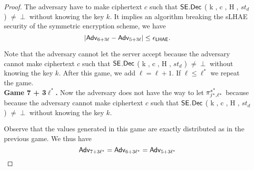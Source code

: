 \begin{proof}
 The adversary have to make ciphertext $c$ such that $\mathsf{SE}$.$\mathsf{Dec}$ ( k , c , H , $st_d$ ) $\neq \perp$ without knowing the key $k$. It implies an algorithm breaking the sLHAE security of the symmetric encryption scheme, we have
 \begin{equation}
  |\mathsf{Adv}_{6 + 3\ell} - \mathsf{Adv}_{5 + 3\ell} | \leq \epsilon_{\mathsf{LHAE}}.
 \end{equation}%

 Note that the adversary cannot let the server accept because the adversary cannot make ciphertext $c$ such that $\mathsf{SE}$.$\mathsf{Dec}$ ( k , c , H , $st_d$ ) $\neq \perp$ without knowing the key $k$.
 After this game, we add $\ell = \ell + 1$. If $\ell \leq \ell^{\ast}$ we repeat the game.
\vspace{10pt}\\%
%
%
 \textbf{Game 7 + 3$\ell^{\ast}$.} Now the adversary does not have the way to let $\pi^{s^{\ast}}_{j^{\ast},\ell^{\ast}}$ because because the adversary cannot make ciphertext $c$ such that $\mathsf{SE}$.$\mathsf{Dec}$ ( k , c , H , $st_d$ ) $\neq \perp$ without knowing the key $k$.

 Observe that the values generated in this game are exactly distributed as in the previous game. We thus have
 \begin{equation}
  \mathsf{Adv}_{7 + 3\ell^{\ast}} = \mathsf{Adv}_{6 + 3\ell^{\ast}} = \mathsf{Adv}_{5 + 3\ell^{\ast}}
 \end{equation}%
%
%
\end{proof}